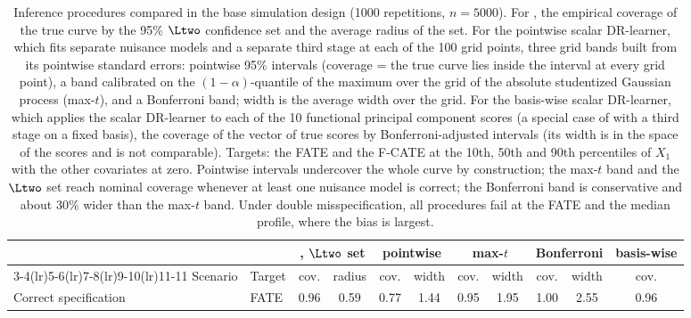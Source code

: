 {\color{teal}
\begin{table}[h]
    \centering
    \caption{Inference procedures compared in the base simulation design (1000 repetitions, $n = 5000$). For \FOCAL{}, the empirical coverage of the true curve by the 95\% $\Ltwo$ confidence set and the average radius of the set. For the pointwise scalar DR-learner, which fits separate nuisance models and a separate third stage at each of the 100 grid points, three grid bands built from its pointwise standard errors: pointwise 95\% intervals (coverage = the true curve lies inside the interval at every grid point), a band calibrated on the $(1-\alpha)$-quantile of the maximum over the grid of the absolute studentized Gaussian process (max-$t$), and a Bonferroni band; width is the average width over the grid. For the basis-wise scalar DR-learner, which applies the scalar DR-learner to each of the 10 functional principal component scores (a special case of \FOCAL{} with a third stage on a fixed basis), the coverage of the vector of true scores by Bonferroni-adjusted intervals (its width is in the space of the scores and is not comparable). Targets: the FATE and the F-CATE at the 10th, 50th and 90th percentiles of $X_1$ with the other covariates at zero. Pointwise intervals undercover the whole curve by construction; the max-$t$ band and the $\Ltwo$ set reach nominal coverage whenever at least one nuisance model is correct; the Bonferroni band is conservative and about 30\% wider than the max-$t$ band. Under double misspecification, all procedures fail at the FATE and the median profile, where the bias is largest.}
    \label{tab:sim_bands}
    \footnotesize\setlength{\tabcolsep}{4pt}
\begin{tabular}{llccccccccc}
\toprule
 & & \multicolumn{2}{c}{\FOCAL{}, $\Ltwo$ set} & \multicolumn{2}{c}{pointwise} & \multicolumn{2}{c}{max-$t$} & \multicolumn{2}{c}{Bonferroni} & basis-wise \\
\cmidrule(lr){3-4}\cmidrule(lr){5-6}\cmidrule(lr){7-8}\cmidrule(lr){9-10}\cmidrule(lr){11-11}
Scenario & Target & cov. & radius & cov. & width & cov. & width & cov. & width & cov. \\
\midrule
Correct specification & FATE & 0.96 & 0.59 & 0.77 & 1.44 & 0.95 & 1.95 & 1.00 & 2.55 & 0.96 \\

\end{tabular}
\end{table}}
